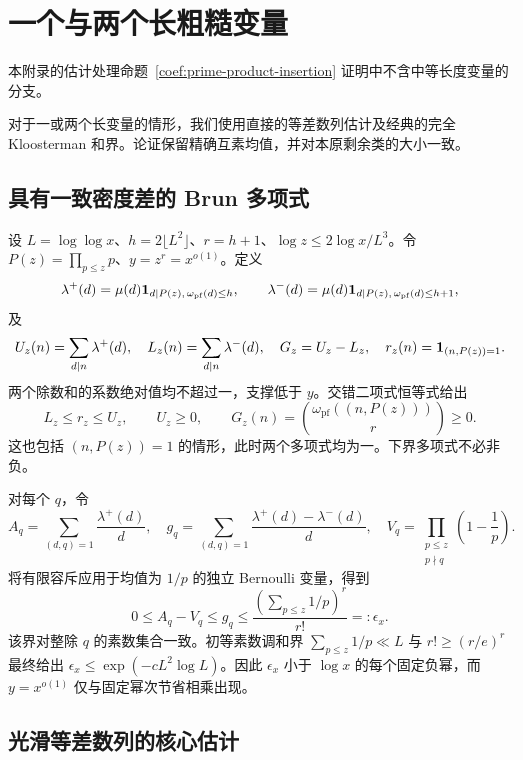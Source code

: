 \section{一个与两个长粗糙变量}
\label{app:brun}

本附录的估计处理命题~\ref{coef:prime-product-insertion} 证明中不含中等长度变量的分支。

对于一或两个长变量的情形，我们使用直接的等差数列估计及经典的完全 Kloosterman 和界。论证保留精确互素均值，并对本原剩余类的大小一致。

\subsection{具有一致密度差的 Brun 多项式}

设 $L=\log\log x$、$h=2\lfloor L^2\rfloor$、$r=h+1$、$\log z\le2\log x/L^3$。令 $P(z)=\prod_{p\le z}p$、$y=z^r=x^{o(1)}$。定义
\[
 \lambda^+(d)=\mu(d)\mathbf 1_{d\mid P(z),\,\omega_{\mathrm{pf}}(d)\le h},
 \qquad
 \lambda^-(d)=\mu(d)\mathbf 1_{d\mid P(z),\,\omega_{\mathrm{pf}}(d)\le h+1},
\]
及
\[
 U_z(n)=\sum_{d\mid n}\lambda^+(d),\quad
 L_z(n)=\sum_{d\mid n}\lambda^-(d),\quad
 G_z=U_z-L_z,\quad r_z(n)=\mathbf 1_{(n,P(z))=1}.
\]
两个除数和的系数绝对值均不超过一，支撑低于 $y$。交错二项式恒等式给出
\begin{equation}
 L_z\le r_z\le U_z,\qquad U_z\ge0,\qquad
 G_z(n)=\binom{\omega_{\mathrm{pf}}((n,P(z)))}{r}\ge0.
 \label{coef:Brun-order}
\end{equation}
这也包括 $(n,P(z))=1$ 的情形，此时两个多项式均为一。下界多项式不必非负。

对每个 $q$，令
\[
 A_q=\sum_{(d,q)=1}\frac{\lambda^+(d)}d,\quad
 g_q=\sum_{(d,q)=1}\frac{\lambda^+(d)-\lambda^-(d)}d,\quad
 V_q=\prod_{\substack{p\le z\\p\nmid q}}\left(1-\frac1p\right).
\]
将有限容斥应用于均值为 $1/p$ 的独立 Bernoulli 变量，得到
\begin{equation}
 0\le A_q-V_q\le g_q
 \le\frac{(\sum_{p\le z}1/p)^r}{r!}=:\epsilon_x.
 \label{coef:Brun-gap}
\end{equation}
该界对整除 $q$ 的素数集合一致。初等素数调和界 $\sum_{p\le z}1/p\ll L$ 与 $r!\ge(r/e)^r$ 最终给出 $\epsilon_x\le\exp(-cL^2\log L)$。因此 $\epsilon_x$ 小于 $\log x$ 的每个固定负幂，而 $y=x^{o(1)}$ 仅与固定幂次节省相乘出现。

\subsection{光滑等差数列的核心估计}

